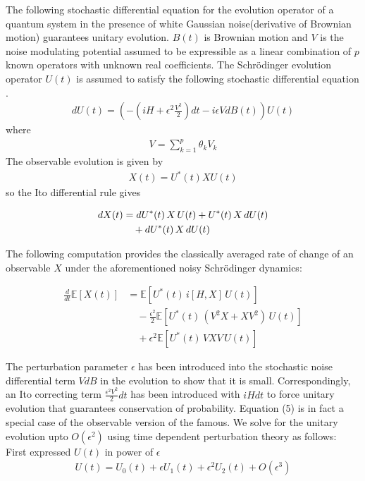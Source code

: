 \documentclass[journal,twocolumn]{IEEEtran}
\begin{document}
The following stochastic differential equation for the evolution operator of a quantum system in the presence of white Gaussian noise(derivative of Brownian motion) guarantees unitary evolution. $B(t)$ is Brownian motion and $V$ is the noise modulating potential assumed to be expressible as a linear combination of $p$ known operators with unknown real coefficients. The Schr\"{o}dinger evolution operator $U(t)$ is assumed to satisfy  the following stochastic differential equation \cite{Ref3}.
\begin{align}
d U(t)= (-(i H +\epsilon^2 \frac{V^2}{2})dt - i\epsilon V d
B(t))U(t)
\end{align}
where
\begin{align} V=\sum\limits_{k=1}^p \theta_kV_k 
\end{align}
The observable evolution is given by 
\begin{align}
X(t)=U^*(t)XU(t)
\end{align}
so the Ito differential rule gives

\begin{align}
dX(t) &= dU^{*}(t)\, X\, U(t) + U^{*}(t)\, X\, dU(t) \notag\\
&\quad + dU^{*}(t)\, X\, dU(t)
\end{align}


The following computation provides the classically averaged rate of change of an observable $X$ under the aforementioned noisy Schr\"{o}dinger dynamics: 

\begin{align}
\frac{d}{dt}\mathbb{E}[X(t)] &= \mathbb{E}\left[ U^{*}(t)\, i[H, X]\, U(t) \right] \\
&\quad - \frac{\epsilon^2}{2} \mathbb{E} \left[ U^{*}(t)\, (V^2 X + X V^2)\, U(t) \right] \nonumber \\
&\quad + \epsilon^2 \mathbb{E} \left[ U^{*}(t)\, V X V\, U(t) \right] \nonumber
\end{align}

The perturbation parameter $\epsilon$ has been introduced into the stochastic noise differential term $V dB$ in the evolution to show that it is small. Correspondingly, an Ito correcting term $\frac{\epsilon^2 V^2}{2}dt$ has been introduced with $iH dt$ to force unitary evolution that guarantees conservation of probability. Equation (5) is in fact a special case of the observable version of the famous. We solve for the unitary evolution upto $O(\epsilon^2)$ using time dependent perturbation theory as follows:\\
First expressed $U(t)$ in power of $\epsilon$
\begin{align}
U(t)=U_0(t)+\epsilon U_1(t)+\epsilon^2 U_2(t)+ O(\epsilon^3)
\end{align}
\end{document}
